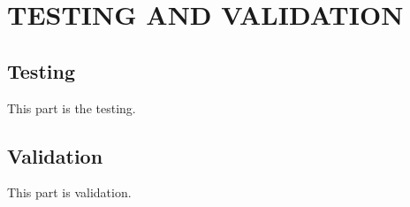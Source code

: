 \section{TESTING AND VALIDATION}
\subsection{Testing}
This part is the testing.

\clearpage
\subsection{Validation}

This part is validation.